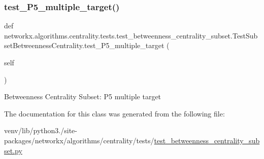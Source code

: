 \subsubsection{\texorpdfstring{test\+\_\+\+P5\+\_\+multiple\+\_\+target()}{test\_P5\_multiple\_target()}}
{\footnotesize\ttfamily def networkx.\+algorithms.\+centrality.\+tests.\+test\+\_\+betweenness\+\_\+centrality\+\_\+subset.\+Test\+Subset\+Betweenness\+Centrality.\+test\+\_\+\+P5\+\_\+multiple\+\_\+target (\begin{DoxyParamCaption}\item[{}]{self }\end{DoxyParamCaption})}

\begin{DoxyVerb}Betweenness Centrality Subset: P5 multiple target\end{DoxyVerb}
 

The documentation for this class was generated from the following file\+:\begin{DoxyCompactItemize}
\item 
venv/lib/python3./site-\/packages/networkx/algorithms/centrality/tests/\hyperlink{test__betweenness__centrality__subset_8py}{test\+\_\+betweenness\+\_\+centrality\+\_\+subset.\+py}\end{DoxyCompactItemize}
